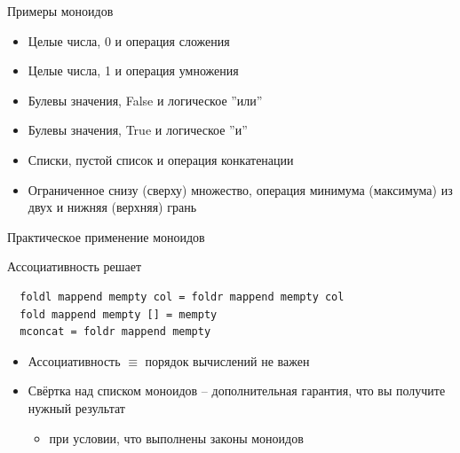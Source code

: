 \documentclass{beamer}
\begin{document}
  \begin{frame}{Примеры моноидов}
        \begin{itemize}
            \item Целые числа, 0 и операция \alert{сложения}
            \item Целые числа, 1 и операция \alert{умножения}
            \item Булевы значения, False и логическое ''или''
            \item Булевы значения, True и логическое ''и''
            \item Списки, пустой список и операция конкатенации
            \item Ограниченное снизу (сверху) множество, операция минимума (максимума) из двух и нижняя (верхняя) грань
        \end{itemize}
  \end{frame}
  \begin{frame}[fragile]{Практическое применение моноидов}
      \begin{block}{Ассоциативность решает}
        \begin{verbatim}
  foldl mappend mempty col = foldr mappend mempty col
  fold mappend mempty [] = mempty
  mconcat = foldr mappend mempty
        \end{verbatim}
      \end{block}
      \begin{itemize}
          \item Ассоциативность $\equiv$ порядок вычислений не важен
          \item Свёртка над списком моноидов -- дополнительная гарантия, что вы получите нужный результат
            \begin{itemize}
                \item при условии, что выполнены \alert{законы моноидов}
            \end{itemize}
      \end{itemize}
  \end{frame}
\end{document}

